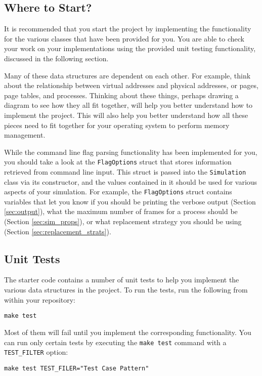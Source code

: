 \documentclass[10pt]{article}
\begin{document}
\subsection{Where to Start?}

It is recommended that you start the project by implementing the functionality for the various classes that have been provided for you. You are able to check your work on your implementations using the provided unit testing functionality, discussed in the following section.

Many of these data structures are dependent on each other. For example, think about the relationship between virtual addresses and physical addresses, or pages, page tables, and processes. Thinking about these things, perhaps drawing a diagram to see how they all fit together, will help you better understand how to implement the project. This will also help you better understand how all these pieces need to fit together for your operating system to perform memory management.

While the command line flag parsing functionality has been implemented for you, you should take a look at the \texttt{FlagOptions} struct that stores information retrieved from command line input. This struct is passed into the \texttt{Simulation} class via its constructor, and the values contained in it should be used for various aspects of your simulation. For example, the \texttt{FlagOptions} struct contains variables that let you know if you should be printing the verbose output (Section \ref{sec:output}), what the maximum number of frames for a process should be (Section \ref{sec:sim_props}), or what replacement strategy you should be using (Section \ref{sec:replacement_strats}).

\subsection{Unit Tests}

The starter code contains a number of unit tests to help you implement the various data structures in the project. To run the tests, run the following from within your repository:

\texttt{make test}

Most of them will fail until you implement the corresponding functionality. You can run only certain tests by executing the \texttt{make test} command with a \texttt{TEST\_FILTER} option:

\texttt{make test TEST\_FILER="Test Case Pattern"}
\end{document}
